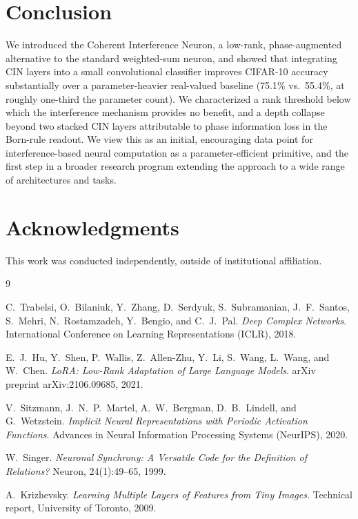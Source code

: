 \documentclass[11pt]{article}
\begin{document}
\section{Conclusion}
\label{sec:conclusion}

We introduced the Coherent Interference Neuron, a low-rank, phase-augmented alternative to the standard weighted-sum neuron, and showed that integrating CIN layers into a small convolutional classifier improves CIFAR-10 accuracy substantially over a parameter-heavier real-valued baseline (75.1\% vs.\ 55.4\%, at roughly one-third the parameter count). We characterized a rank threshold below which the interference mechanism provides no benefit, and a depth collapse beyond two stacked CIN layers attributable to phase information loss in the Born-rule readout. We view this as an initial, encouraging data point for interference-based neural computation as a parameter-efficient primitive, and the first step in a broader research program extending the approach to a wide range of architectures and tasks.

\section*{Acknowledgments}
This work was conducted independently, outside of institutional affiliation.


\begin{thebibliography}{9}

C.~Trabelsi, O.~Bilaniuk, Y.~Zhang, D.~Serdyuk, S.~Subramanian, J.~F.~Santos, S.~Mehri, N.~Rostamzadeh, Y.~Bengio, and C.~J.~Pal.
\textit{Deep Complex Networks}.
International Conference on Learning Representations (ICLR), 2018.

E.~J.~Hu, Y.~Shen, P.~Wallis, Z.~Allen-Zhu, Y.~Li, S.~Wang, L.~Wang, and W.~Chen.
\textit{LoRA: Low-Rank Adaptation of Large Language Models}.
arXiv preprint arXiv:2106.09685, 2021.

V.~Sitzmann, J.~N.~P.~Martel, A.~W.~Bergman, D.~B.~Lindell, and G.~Wetzstein.
\textit{Implicit Neural Representations with Periodic Activation Functions}.
Advances in Neural Information Processing Systems (NeurIPS), 2020.

W.~Singer.
\textit{Neuronal Synchrony: A Versatile Code for the Definition of Relations?}
Neuron, 24(1):49--65, 1999.

A.~Krizhevsky.
\textit{Learning Multiple Layers of Features from Tiny Images}.
Technical report, University of Toronto, 2009.

\end{thebibliography}
\end{document}
